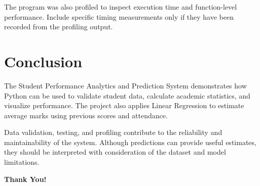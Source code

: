 \documentclass[12pt,a4paper]{article}
\begin{document}
The program was also profiled to inspect execution time
and function-level performance. Include specific timing
measurements only if they have been recorded from the
profiling output.


\section{Conclusion}

The Student Performance Analytics and Prediction System
demonstrates how Python can be used to validate student
data, calculate academic statistics, and visualize performance.
The project also applies Linear Regression to estimate average
marks using previous scores and attendance.

Data validation, testing, and profiling contribute to the
reliability and maintainability of the system. Although
predictions can provide useful estimates, they should be
interpreted with consideration of the dataset and model
limitations.

\vspace{2.5cm}
\begin{center}
    \Large{\textbf{Thank You!}}
\end{center}
\end{document}
